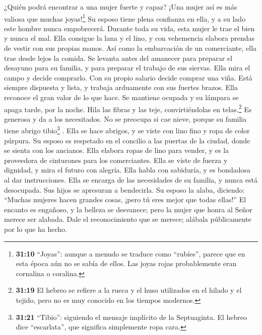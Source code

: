  ¿Quién podrá encontrar a una mujer fuerte y capaz? ¡Una
mujer así es más valiosa que muchas joyas!\footnote{\textbf{31:10}
  ``Joyas'': aunque a menudo se traduce como ``rubíes'', parece que en
  esta época aún no se sabía de ellos. Las joyas rojas probablemente
  eran cornalina o coralina.}  Su esposo tiene plena
confianza en ella, y a su lado este hombre nunca empobrecerá.
 Durante toda su vida, esta mujer le trae el bien y nunca
el mal.  Ella consigue la lana y el lino, y con
vehemencia elabora prendas de vestir con sus propias manos.
 Así como la embarcación de un comerciante, ella trae
desde lejos la comida.  Se levanta antes del amanecer
para preparar el desayuno para su familia, y para preparar el trabajo de
sus siervas.  Ella mira el campo y decide comprarlo. Con
su propio salario decide comprar una viña.  Está siempre
dispuesta y lista, y trabaja arduamente con sus fuertes brazos.
 Ella reconoce el gran valor de lo que hace. Se mantiene
ocupada y su lámpara se apaga tarde, por la noche.  Hila
las fibras y las teje, convirtiéndolas en telas.\footnote{\textbf{31:19}
  El hebreo se refiere a la rueca y el huso utilizados en el hilado y el
  tejido, pero no es muy conocido en los tiempos modernos.}
 Es generosa y da a los necesitados.  No
se preocupa si cae nieve, porque su familia tiene abrigo
tibio\footnote{\textbf{31:21} ``Tibio'': siguiendo el mensaje implícito
  de la Septuaginta. El hebreo dice ``escarlata'', que significa
  simplemente ropa cara.} .  Ella se hace abrigos, y se
viste con lino fino y ropa de color púrpura.  Su esposo
es respetado en el concilio a las puertas de la ciudad, donde se sienta
con los ancianos.  Ella elabora ropas de lino para
vender, y es la proveedora de cinturones para los comerciantes.
 Ella se viste de fuerza y dignidad, y mira el futuro con
alegría.  Ella habla con sabiduría, y es bondadosa al dar
instrucciones.  Ella se encarga de las necesidades de su
familia, y nunca está desocupada.  Sus hijos se apresuran
a bendecirla. Su esposo la alaba, diciendo:  ``Muchas
mujeres hacen grandes cosas, ¡pero tú eres mejor que todas ellas!''
 El encanto es engañoso, y la belleza se desvanece; pero
la mujer que honra al Señor merece ser alabada.  Dale el
reconocimiento que se merece; alábala públicamente por lo que ha hecho.
